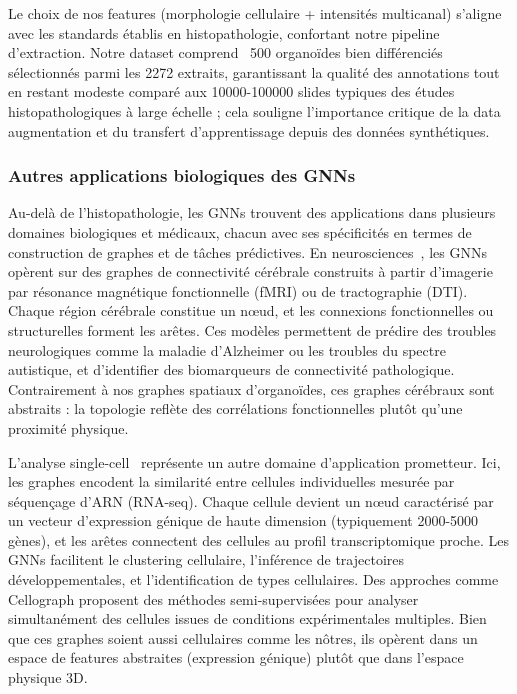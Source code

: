 Le choix de nos features (morphologie cellulaire + intensités multicanal) s'aligne avec les standards établis en histopathologie, confortant notre pipeline d'extraction. Notre dataset comprend ~500 organoïdes bien différenciés sélectionnés parmi les 2272 extraits, garantissant la qualité des annotations tout en restant modeste comparé aux 10000-100000 slides typiques des études histopathologiques à large échelle ; cela souligne l'importance critique de la data augmentation et du transfert d'apprentissage depuis des données synthétiques.

\subsubsection{Autres applications biologiques des GNNs}

Au-delà de l'histopathologie, les GNNs trouvent des applications dans plusieurs domaines biologiques et médicaux, chacun avec ses spécificités en termes de construction de graphes et de tâches prédictives. En neurosciences~\cite{Luo2024,Bessadok2022}, les GNNs opèrent sur des graphes de connectivité cérébrale construits à partir d'imagerie par résonance magnétique fonctionnelle (fMRI) ou de tractographie (DTI). Chaque région cérébrale constitue un nœud, et les connexions fonctionnelles ou structurelles forment les arêtes. Ces modèles permettent de prédire des troubles neurologiques comme la maladie d'Alzheimer ou les troubles du spectre autistique, et d'identifier des biomarqueurs de connectivité pathologique. Contrairement à nos graphes spatiaux d'organoïdes, ces graphes cérébraux sont abstraits : la topologie reflète des corrélations fonctionnelles plutôt qu'une proximité physique.

L'analyse single-cell~\cite{Shahir2024} représente un autre domaine d'application prometteur. Ici, les graphes encodent la similarité entre cellules individuelles mesurée par séquençage d'ARN (RNA-seq). Chaque cellule devient un nœud caractérisé par un vecteur d'expression génique de haute dimension (typiquement 2000-5000 gènes), et les arêtes connectent des cellules au profil transcriptomique proche. Les GNNs facilitent le clustering cellulaire, l'inférence de trajectoires développementales, et l'identification de types cellulaires. Des approches comme Cellograph proposent des méthodes semi-supervisées pour analyser simultanément des cellules issues de conditions expérimentales multiples. Bien que ces graphes soient aussi cellulaires comme les nôtres, ils opèrent dans un espace de features abstraites (expression génique) plutôt que dans l'espace physique 3D.

